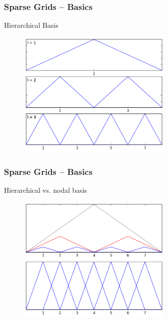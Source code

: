 \begin{frame}
  \frametitle{Sparse Grids -- Basics}
  \topline
  \vspace{-10px}
  \begin{block}{Hierarchical Basis}
    \begin{figure}[!htp]
      \centering
      \includegraphics[width=7.5cm]{images/sparse_hats}
      \vspace{-12px}
      \caption{}
    \end{figure}
  \end{block}
\end{frame}

\begin{frame}
  \frametitle{Sparse Grids -- Basics}
  \topline
  \vspace{-10px}
  \begin{block}{Hierarchical vs. nodal basis}
    \begin{figure}[!htp]
      \centering
      \includegraphics[width=7.5cm]{images/sparse_together}
      \vspace{-12px}
      \caption{}
    \end{figure}
  \end{block}
\end{frame}

